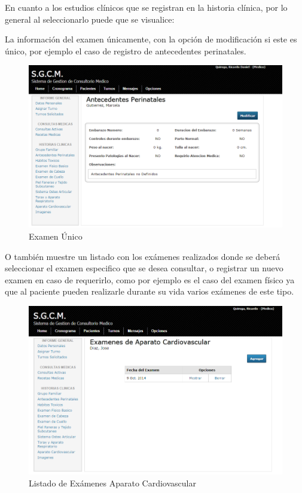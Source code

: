 En cuanto a los estudios clínicos que se registran en la historia clínica, por lo general al seleccionarlo puede que se visualice: 


La información del examen únicamente, con la opción de modificación si este es único, por ejemplo el caso de registro de antecedentes perinatales.

\begin{figure}[H]
    \centering
    \includegraphics[scale=0.5]{resourse/modificar-perinatales.png}
    \caption{Examen Único}
    \label{fig:618}
\end{figure}

O también muestre un listado con los exámenes realizados donde se deberá seleccionar el examen especifico que se desea consultar, o registrar un nuevo examen en caso de requerirlo, como por ejemplo es el caso del examen físico ya que al paciente pueden realizarle durante su vida varios exámenes de este tipo.

\begin{figure}[H]
    \centering
    \includegraphics[scale=0.5]{resourse/listado-cardio.png}
    \caption{Listado de Exámenes Aparato Cardiovascular}
    \label{fig:619}
\end{figure}

